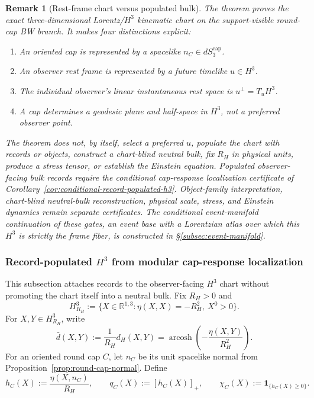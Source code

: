 \documentclass[11pt]{article}
\newtheorem{remark}[theorem]{Remark}
\begin{document}
\begin{remark}[Rest-frame chart versus populated bulk]\label{rem:h3-chart-not-populated-bulk}
The theorem proves the exact three-dimensional Lorentz/\(H^3\) kinematic chart
on the support-visible round-cap BW branch. It makes four distinctions
explicit:
\begin{enumerate}[leftmargin=2em]
\item An oriented cap is represented by a spacelike
\(n_C\in dS_3^{\mathrm{cap}}\).
\item An observer rest frame is represented by a future timelike \(u\in H^3\).
\item The individual observer's linear instantaneous rest space is
\(u^\perp=T_uH^3\).
\item A cap determines a geodesic plane and half-space in \(H^3\), not a
preferred observer point.
\end{enumerate}
The theorem does not, by itself, select a preferred \(u\), populate the chart
with records or objects, construct a chart-blind neutral bulk, fix \(R_H\) in
physical units, produce a stress tensor, or establish the Einstein equation.
Populated observer-facing bulk records require the conditional cap-response
localization certificate of Corollary~\ref{cor:conditional-record-populated-h3}.
Object-family interpretation, chart-blind neutral-bulk reconstruction, physical
scale, stress, and Einstein dynamics remain separate certificates. The conditional
event-manifold continuation of these gates, an event base with a Lorentzian atlas over
which this \(H^3\) is strictly the frame fiber, is constructed in
\S\ref{subsec:event-manifold}.
\end{remark}
\subsubsection{Record-populated \(H^3\) from modular cap-response localization}
\label{subsec:record-populated-h3-localization}

This subsection attaches records to the observer-facing \(H^3\) chart without
promoting the chart itself into a neutral bulk. Fix \(R_H>0\) and
\[
H^3_{R_H}:=\{X\in\mathbb R^{1,3}:\eta(X,X)=-R_H^2,\ X^0>0\}.
\]
For \(X,Y\in H^3_{R_H}\), write
\[
\bar d(X,Y):=\frac{1}{R_H}d_H(X,Y)
=\operatorname{arcosh}\!\left(-\frac{\eta(X,Y)}{R_H^2}\right).
\]
For an oriented round cap \(C\), let \(n_C\) be its unit spacelike normal from
Proposition~\ref{prop:round-cap-normal}. Define
\[
h_C(X):=\frac{\eta(X,n_C)}{R_H},\qquad
q_C(X):=[h_C(X)]_+,\qquad
\chi_C(X):=\mathbf 1_{\{h_C(X)\geq0\}}.
\]
\end{document}
